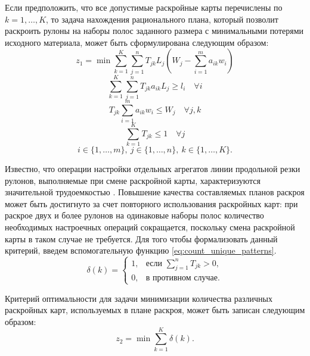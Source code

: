 \documentclass[12pt]{article}
\begin{document}
Если предположить, что все допустимые раскройные карты перечислены по 
$k=1,\ldots,K$, то задача нахождения рационального плана, который позволит 
раскроить рулоны на наборы полос заданного размера с минимальными потерями 
исходного материала, может быть сформулирована следующим образом:
\begin{equation}\label{eq:min_trim_loss}
    z_1=\min{\sum_{k=1}^{K} \sum_{j=1}^{n} T_{jk} L_j 
        \left(W_j-\sum_{i=1}^{m} a_{ik}w_i\right)}
\end{equation}
\begin{equation}\label{eq:orders_are_meet}
     \sum_{k=1}^{K} \sum_{j=1}^{n} T_{jk} a_{ik} L_j \geq l_i \quad \forall i
\end{equation}
\begin{equation}\label{eq:pattern_feasible}
     T_{jk} \sum_{i=1}^{m} a_{ik} w_i \leq W_j \quad \forall j,k
\end{equation}
\begin{equation}\label{eq:rolls_cut_once}
     \sum_{k=1}^{K} T_{jk} \leq 1 \quad \forall j
\end{equation}
\[ i \in \{1,\ldots,m\}, \: j \in \{1,\ldots,n\}, \: k \in \{1,\ldots,K\}.\]

Известно, что операции настройки отдельных агрегатов линии продольной резки 
рулонов, выполняемые при смене раскройной карты, характеризуются значительной 
трудоемкостью \cite{haessler88, song06}. Повышение качества составляемых планов раскроя может 
быть достигнуто за счет повторного использования раскройных карт: при раскрое 
двух и более рулонов на одинаковые наборы полос количество необходимых 
настроечных операций сокращается, поскольку смена раскройной карты в таком 
случае не требуется. Для того чтобы формализовать данный критерий, введем 
вспомогательную функцию 
\eqref{eq:count_unique_patterns}.
\begin{equation}\label{eq:count_unique_patterns}
    \delta\left(k\right)=
        \begin{cases}
            1, & \text{если } \sum_{j=1}^{n} T_{jk}>0, \\
            0, & \text{в противном случае}.
        \end{cases}    
\end{equation}

Критерий оптимальности для задачи минимизации количества различных раскройных 
карт, используемых в плане раскроя, может быть записан следующим образом:
\begin{equation}\label{eq:min_patterns}
    z_2=\min{\sum_{k=1}^{K}} \delta\left(k\right).
\end{equation}
\end{document}
